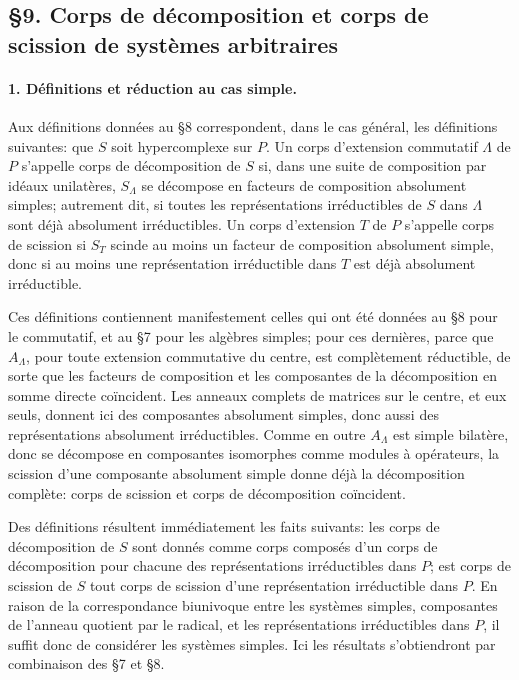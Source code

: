 \subsection*{\S 9. Corps de décomposition et corps de scission de systèmes arbitraires}

\paragraph{1. Définitions et réduction au cas simple.}
Aux définitions données au \S 8 correspondent, dans le cas général, les définitions suivantes: que \(S\) soit hypercomplexe sur \(P\). Un corps d'extension commutatif \(\Lambda\) de \(P\) s'appelle corps de décomposition de \(S\) si, dans une suite de composition par idéaux unilatères, \(S_\Lambda\) se décompose en facteurs de composition absolument simples; autrement dit, si toutes les représentations irréductibles de \(S\) dans \(\Lambda\) sont déjà absolument irréductibles. Un corps d'extension \(T\) de \(P\) s'appelle corps de scission si \(S_T\) scinde au moins un facteur de composition absolument simple, donc si au moins une représentation irréductible dans \(T\) est déjà absolument irréductible.

Ces définitions contiennent manifestement celles qui ont été données au \S 8 pour le commutatif, et au \S 7 pour les algèbres simples; pour ces dernières, parce que \(A_\Lambda\), pour toute extension commutative du centre, est complètement réductible, de sorte que les facteurs de composition et les composantes de la décomposition en somme directe coïncident. Les anneaux complets de matrices sur le centre, et eux seuls, donnent ici des composantes absolument simples, donc aussi des représentations absolument irréductibles. Comme en outre \(A_\Lambda\) est simple bilatère, donc se décompose en composantes isomorphes comme modules à opérateurs, la scission d'une composante absolument simple donne déjà la décomposition complète: corps de scission et corps de décomposition coïncident.

Des définitions résultent immédiatement les faits suivants: les corps de décomposition de \(S\) sont donnés comme corps composés d'un corps de décomposition pour chacune des représentations irréductibles dans \(P\); est corps de scission de \(S\) tout corps de scission d'une représentation irréductible dans \(P\). En raison de la correspondance biunivoque entre les systèmes simples, composantes de l'anneau quotient par le radical, et les représentations irréductibles dans \(P\), il suffit donc de considérer les systèmes simples. Ici les résultats s'obtiendront par combinaison des \S 7 et \S 8.

